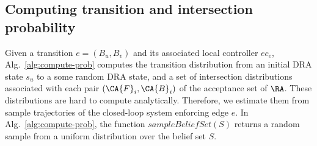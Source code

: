 %
%
%

\subsection{Computing transition and intersection probability}

Given a transition $e=(B_u, B_v)$ and its associated local controller $ec_e$,
Alg.~\ref{alg:compute-prob} computes the transition distribution from
an initial DRA state $s_u$ to a some random DRA state, and a set
of intersection distributions associated with each pair $(\CA{F}_i, \CA{B}_i)$
of the acceptance set of $\RA$.
These distributions are hard to compute analytically. Therefore, we
estimate them from sample trajectories of the closed-loop system
enforcing edge $e$.
In Alg.~\ref{alg:compute-prob}, the function $sampleBeliefSet(S)$
returns a random sample from a uniform distribution over the
belief set $S$.

